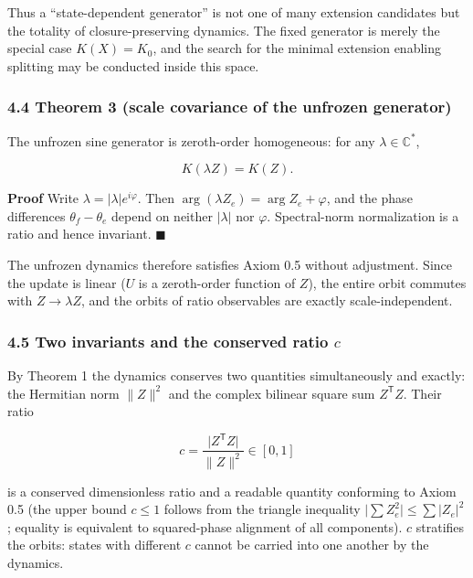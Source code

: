 \documentclass[
  a4paper,
]{article}
\begin{document}
Thus a ``state-dependent generator'' is not one of many extension
candidates but the totality of closure-preserving dynamics. The fixed
generator is merely the special case \(K(X)=K_0\), and the search for
the minimal extension enabling splitting may be conducted inside this
space.

\subsubsection{4.4 Theorem 3 (scale covariance of the unfrozen
generator)}\label{theorem-3-scale-covariance-of-the-unfrozen-generator}

The unfrozen sine generator is zeroth-order homogeneous: for any
\(\lambda\in\mathbb C^\ast\),

\[
K(\lambda Z)=K(Z).
\]

\textbf{Proof} Write \(\lambda=|\lambda|e^{i\varphi}\). Then
\(\arg(\lambda Z_e)=\arg Z_e+\varphi\), and the phase differences
\(\theta_f-\theta_e\) depend on neither \(|\lambda|\) nor \(\varphi\).
Spectral-norm normalization is a ratio and hence invariant.
\(\blacksquare\)

The unfrozen dynamics therefore satisfies Axiom 0.5 without adjustment.
Since the update is linear (\(U\) is a zeroth-order function of \(Z\)),
the entire orbit commutes with \(Z\to\lambda Z\), and the orbits of
ratio observables are exactly scale-independent.

\subsubsection{\texorpdfstring{4.5 Two invariants and the conserved
ratio
\(c\)}{4.5 Two invariants and the conserved ratio c}}\label{two-invariants-and-the-conserved-ratio-c}

By Theorem 1 the dynamics conserves two quantities simultaneously and
exactly: the Hermitian norm \(\lVert Z\rVert^2\) and the complex
bilinear square sum \(Z^{\mathsf T}Z\). Their ratio

\[
c=\frac{\lvert Z^{\mathsf T}Z\rvert}{\lVert Z\rVert^2}\in[0,1]
\]

is a conserved dimensionless ratio and a readable quantity conforming to
Axiom 0.5 (the upper bound \(c\le1\) follows from the triangle
inequality \(\lvert\sum Z_e^2\rvert\le\sum\lvert Z_e\rvert^2\); equality
is equivalent to squared-phase alignment of all components). \(c\)
stratifies the orbits: states with different \(c\) cannot be carried
into one another by the dynamics.
\end{document}
